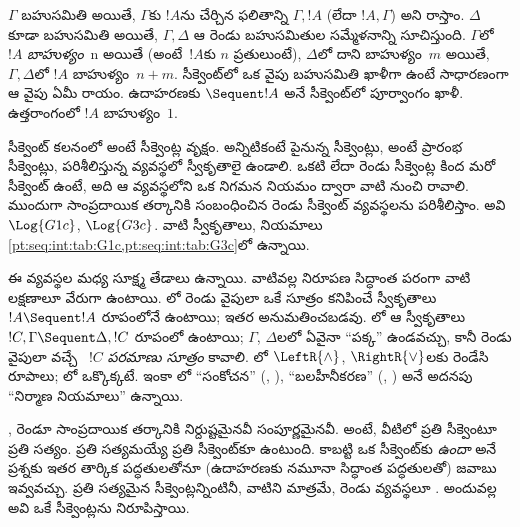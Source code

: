 \documentclass[../../../include/open-logic-section]{subfiles}
\begin{document}
$\Gamma$  బహుసమితి అయితే, $\Gamma$కు $!A$ను చేర్చిన ఫలితాన్ని $\Gamma, !A$ (లేదా $!A, \Gamma$) అని రాస్తాం. $\Delta$ కూడా  బహుసమితి అయితే, $\Gamma, \Delta$ ఆ రెండు బహుసమితుల సమ్మేళనాన్ని సూచిస్తుంది. $\Gamma$లో $!A$ \emph{బాహుళ్యం}~n అయితే (అంటే~$!A$కు $n$ ప్రతులుంటే), $\Delta$లో దాని బాహుళ్యం~$m$ అయితే, $\Gamma, \Delta$లో $!A$ బాహుళ్యం~$n+m$. సీక్వెంట్‌లో ఒక వైపు బహుసమితి ఖాళీగా ఉంటే సాధారణంగా ఆ వైపు ఏమీ రాయం. ఉదాహరణకు $\Sequent !A$ అనే సీక్వెంట్‌లో పూర్వాంగం ఖాళీ. ఉత్తరాంగంలో $!A$ బాహుళ్యం~$1$.

సీక్వెంట్ కలనంలో  అంటే సీక్వెంట్ల వృక్షం. అన్నిటికంటే పైనున్న సీక్వెంట్లు, అంటే ప్రారంభ సీక్వెంట్లు, పరిశీలిస్తున్న వ్యవస్థలో స్వీకృతాలై ఉండాలి. ఒకటి లేదా రెండు సీక్వెంట్ల కింద మరో సీక్వెంట్ ఉంటే, అది ఆ వ్యవస్థలోని ఒక నిగమన నియమం ద్వారా వాటి నుంచి రావాలి. ముందుగా సాంప్రదాయిక తర్కానికి సంబంధించిన రెండు సీక్వెంట్ వ్యవస్థలను పరిశీలిస్తాం. అవి $\Log{G1c}$, $\Log{G3c}$. వాటి స్వీకృతాలు, నియమాలు \cref{pt:seq:int:tab:G1c,pt:seq:int:tab:G3c}లో ఉన్నాయి. 




ఈ వ్యవస్థల మధ్య సూక్ష్మ తేడాలు ఉన్నాయి. వాటివల్ల నిరూపణ సిద్ధాంత పరంగా వాటి లక్షణాలూ వేరుగా ఉంటాయి. లో రెండు వైపులా ఒకే సూత్రం కనిపించే స్వీకృతాలు $!A
\Sequent !A$ రూపంలోనే ఉంటాయి; ఇతర  అనుమతించబడవు. లో ఆ స్వీకృతాలు $!C, \Gamma \Sequent \Delta, !C$ రూపంలో ఉంటాయి; $\Gamma$, $\Delta$లలో ఏవైనా “పక్క”  ఉండవచ్చు, కానీ రెండు వైపులా వచ్చే ~$!C$ \emph{పరమాణు సూత్రం} కావాలి. లో $\LeftR{\land}$, $\RightR{\lor}$లకు రెండేసి రూపాలు; లో ఒక్కొక్కటే. ఇంకా లో “సంకోచన” (\LeftR{\Contraction}, \RightR{\Contraction}), “బలహీనీకరణ” (\LeftR{\Weakening}, \RightR{\Weakening}) అనే అదనపు “నిర్మాణ నియమాలు” ఉన్నాయి.

,  రెండూ సాంప్రదాయిక తర్కానికి నిర్దుష్టమైనవీ సంపూర్ణమైనవీ. అంటే, వీటిలో  ప్రతి సీక్వెంటూ ప్రతి  సత్యం. ప్రతి  సత్యమయ్యే ప్రతి సీక్వెంట్‌కూ  ఉంటుంది. కాబట్టి ఒక సీక్వెంట్‌కు  \emph{ఉందా} అనే ప్రశ్నకు ఇతర తార్కిక పద్ధతులతోనూ (ఉదాహరణకు నమూనా సిద్ధాంత పద్ధతులతో) జవాబు ఇవ్వవచ్చు. ప్రతి  సత్యమైన సీక్వెంట్లన్నింటినీ, వాటిని మాత్రమే, రెండు వ్యవస్థలూ . అందువల్ల అవి ఒకే సీక్వెంట్లను నిరూపిస్తాయి.
\end{document}

